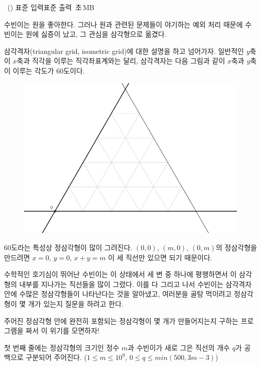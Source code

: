 \begin{problem}{\kcpcpprobtriangle\ (\kcpcpprobtriangleshort)}
    {표준 입력}{표준 출력}
    {\kcpcpprobtriangletime\,초}{\kcpcpprobtrianglememory\,MB}{}
    
    수빈이는 원을 좋아한다. 그러나 원과 관련된 문제들이 야기하는 예외 처리 때문에 수빈이는 원에 싫증이 났고, 그 관심을 삼각형으로 옮겼다.
    
    삼각격자(triangular grid, isometric grid)에 대한 설명을 하고 넘어가자. 일반적인 $ y $축이 $ x $축과 직각을 이루는 직각좌표계와는 달리, 삼각격자는 다음 그림과 같이 $ x $축과 $ y $축이 이루는 각도가 60도이다.
    
    \begin{figure}[h]
        \centering
        \includegraphics[height=0.25\textheight]{./problems/triangle-pic1.png}
    \end{figure}

    60도라는 특성상 정삼각형이 많이 그려진다. $ (0,0) $, $ (m,0) $, $ (0,m) $의 정삼각형을 만드려면 $ x=0 $, $ y=0 $, $ x+y=m $ 이 세 직선만 있으면 되기 때문이다.
    
    수학적인 호기심이 뛰어난 수빈이는 이 상태에서 세 변 중 하나에 평행하면서 이 삼각형의 내부를 지나가는 직선들을 많이 그렸다. 이를 다 그리고 나서 수빈이는 삼각격자 안에 수많은 정삼각형들이 나타난다는 것을 알아냈고, 여러분을 골탕 먹이려고 정삼각형이 몇 개가 있는지 질문을 하려고 한다.
    
    주어진 정삼각형 안에 완전히 포함되는 정삼각형이 몇 개가 만들어지는지 구하는 프로그램을 짜서 이 위기를 모면하자!
    
    \InputFile
    
    첫 번째 줄에는 정삼각형의 크기인 정수 $ m $과 수빈이가 새로 그은 직선의 개수 $ q $가 공백으로 구분되어 주어진다. ($ 1 \leq m \leq 10^9 $, $ 0 \leq q \leq min(500, 3m-3)$)
    

\end{problem}
